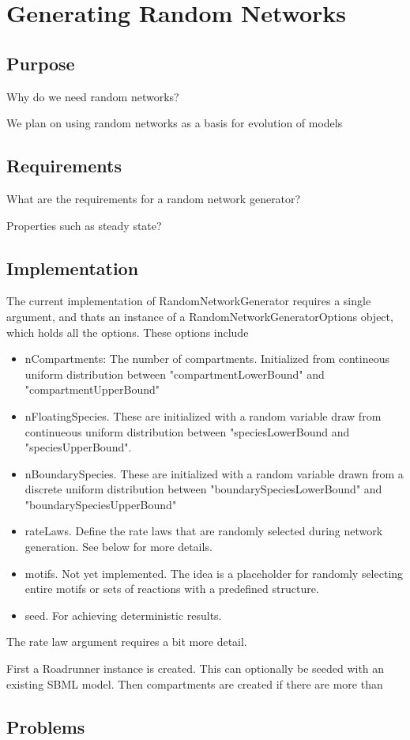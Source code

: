 \documentclass[../Thesis.tex]{subfiles}
\begin{document}
    \chapter{Generating Random Networks}

    \section{Purpose}
    Why do we need random networks?

    We plan on using random networks as a basis for evolution of models

    \section{Requirements}
    What are the requirements for a random network generator?

    Properties such as steady state?

    \section{Implementation}
    The current implementation of RandomNetworkGenerator requires a single argument,
    and thats an instance of a RandomNetworkGeneratorOptions object, which holds
    all the options. These options include
    \begin{itemize}
        \item nCompartments: The number of compartments. Initialized from contineous uniform distribution
        between "compartmentLowerBound" and "compartmentUpperBound"
        \item nFloatingSpecies.
        These are initialized with a random variable draw from continueous uniform
        distribution between "speciesLowerBound and "speciesUpperBound".
        \item nBoundarySpecies.
        These are initialized with a random variable drawn from a discrete uniform distribution between
        "boundarySpeciesLowerBound" and "boundarySpeciesUpperBound"
        \item rateLaws.
        Define the rate laws that are randomly selected during network generation.
        See below for more details.
        \item motifs. Not yet implemented. The idea is a placeholder for randomly selecting entire motifs or sets of reactions with a predefined structure.
        \item seed. For achieving deterministic results.
    \end{itemize}

    The rate law argument requires a bit more detail.



    First a Roadrunner instance is created. This can optionally be seeded with an existing SBML model.
    Then compartments are created if there are more than

    \section{Problems}
\end{document}
